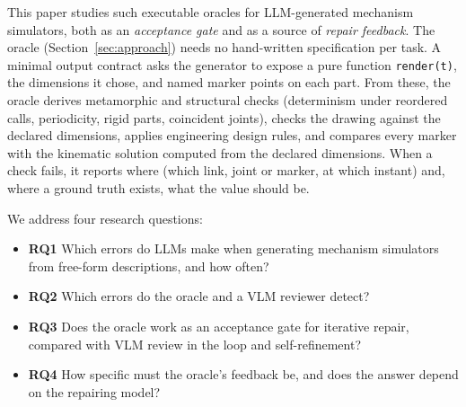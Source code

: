 This paper studies such executable oracles for LLM-generated mechanism simulators, both as an \emph{acceptance gate} and as a source of \emph{repair feedback}. The oracle (Section~\ref{sec:approach}) needs no hand-written specification per task. A minimal output contract asks the generator to expose a pure function \texttt{render(t)}, the dimensions it chose, and named marker points on each part. From these, the oracle derives metamorphic and structural checks (determinism under reordered calls, periodicity, rigid parts, coincident joints), checks the drawing against the declared dimensions, applies engineering design rules, and compares every marker with the kinematic solution computed from the declared dimensions. When a check fails, it reports where (which link, joint or marker, at which instant) and, where a ground truth exists, what the value should be.

We address four research questions:
\begin{itemize}
\item \textbf{RQ1} Which errors do LLMs make when generating mechanism simulators from free-form descriptions, and how often?
\item \textbf{RQ2} Which errors do the oracle and a VLM reviewer detect?
\item \textbf{RQ3} Does the oracle work as an acceptance gate for iterative repair, compared with VLM review in the loop and self-refinement?
\item \textbf{RQ4} How specific must the oracle's feedback be, and does the answer depend on the repairing model?
\end{itemize}

